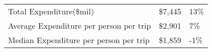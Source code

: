 \begin{tabular}[t]{|p{4.7cm}|p{1.25cm}|p{1.3cm}|}
  \hline
  \hline
Total Expenditure(\$mil) & \$7,445 & 13\% \\ 
  Average Expenditure per person per trip & \$2,901 & 7\% \\ 
  Median Expenditure per person per trip & \$1,859 & -1\% \\ 
   \hline
\end{tabular}
